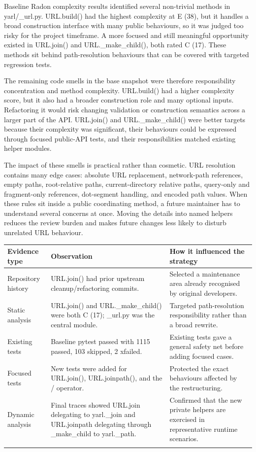 \documentclass[11pt,a4paper]{article}
\begin{document}
Baseline Radon complexity results identified several non-trivial methods in yarl/\_url.py. URL.build() had the highest complexity at E (38), but it handles a broad construction interface with many public behaviours, so it was judged too risky for the project timeframe. A more focused and still meaningful opportunity existed in URL.join() and URL.\_make\_child(), both rated C (17). These methods sit behind path-resolution behaviours that can be covered with targeted regression tests.


The remaining code smells in the base snapshot were therefore responsibility concentration and method complexity. URL.build() had a higher complexity score, but it also had a broader construction role and many optional inputs. Refactoring it would risk changing validation or construction semantics across a larger part of the API. URL.join() and URL.\_make\_child() were better targets because their complexity was significant, their behaviours could be expressed through focused public-API tests, and their responsibilities matched existing helper modules.


The impact of these smells is practical rather than cosmetic. URL resolution contains many edge cases: absolute URL replacement, network-path references, empty paths, root-relative paths, current-directory relative paths, query-only and fragment-only references, dot-segment handling, and encoded path values. When these rules sit inside a public coordinating method, a future maintainer has to understand several concerns at once. Moving the details into named helpers reduces the review burden and makes future changes less likely to disturb unrelated URL behaviour.


\begin{longtable}{p{} p{} p{}}
\toprule
Evidence type & Observation & How it influenced the strategy \\
\midrule
Repository history & URL.join() had prior upstream cleanup/refactoring commits. & Selected a maintenance area already recognised by original developers. \\
\addlinespace
Static analysis & URL.join() and URL.\_make\_child() were both C (17); \_url.py was the central module. & Targeted path-resolution responsibility rather than a broad rewrite. \\
\addlinespace
Existing tests & Baseline pytest passed with 1115 passed, 103 skipped, 2 xfailed. & Existing tests gave a general safety net before adding focused cases. \\
\addlinespace
Focused tests & New tests were added for URL.join(), URL.joinpath(), and the / operator. & Protected the exact behaviours affected by the restructuring. \\
\addlinespace
Dynamic analysis & Final traces showed URL.join delegating to yarl.\_join and URL.joinpath delegating through \_make\_child to yarl.\_path. & Confirmed that the new private helpers are exercised in representative runtime scenarios. \\
\addlinespace
\bottomrule
\end{longtable}
\end{document}
